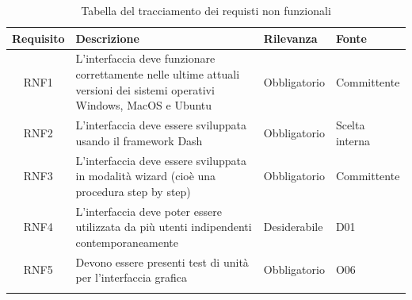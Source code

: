 \begin{longtable}{cp{8cm}ll}
\hline
\hline
\textbf{Requisito} & \textbf{Descrizione} &  \textbf{Rilevanza} & \textbf{Fonte}\\
\hline
RNF1 & L'interfaccia deve funzionare correttamente nelle ultime attuali versioni dei sistemi operativi Windows, MacOS e Ubuntu & Obbligatorio & Committente \\
\hline
RNF2 & L'interfaccia deve essere sviluppata usando il framework Dash & Obbligatorio & Scelta interna \\
\hline
RNF3 & L'interfaccia deve essere sviluppata in modalità wizard (cioè una procedura step by step) & Obbligatorio & Committente \\
\hline
RNF4 & L'interfaccia deve poter essere utilizzata da più utenti indipendenti contemporaneamente & Desiderabile & D01 \\
\hline
RNF5 & Devono essere presenti test di unità per l'interfaccia grafica & Obbligatorio & O06 \\

\hline
\hline
\caption{Tabella del tracciamento dei requisti non funzionali}
\end{longtable}